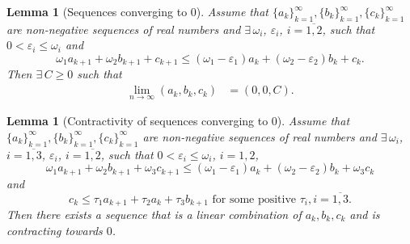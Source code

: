 \documentclass[3p]{elsarticle}
\newtheorem{lemma}[theorem]{Lemma}
\begin{document}
\begin{lemma}[Sequences converging to $0$]\label{lem:SeqConv0}
 Assume that $\{a_k\}_{k=1}^\infty, \{b_k\}_{k=1}^\infty, \{c_k\}_{k=1}^\infty$ are non-negative sequences of real numbers and $\exists \, \omega_i$, $\varepsilon_i$, $i=\overline{1,2}$, such that $0<\varepsilon_i \le \omega_i$ and 
 \begin{equation*}
  \omega_1 a_{k+1} + \omega_2 b_{k+1} + c_{k+1} \leq \left(\omega_1-\varepsilon_1 \right) a_k + \left(\omega_2 - \varepsilon_2 \right) b_{k} + c_{k}.
 \end{equation*}
Then $\exists \, C \ge 0$ such that 
\begin{align*}
 \lim\limits_{n \rightarrow \infty} \left(a_k,b_k,c_k\right) & = (0,0,C).
\end{align*}
\end{lemma}
\begin{lemma}[Contractivity of sequences converging to $0$]\label{ContractivitySequence}
Assume that $\{a_k\}_{k=1}^\infty, \{b_k\}_{k=1}^\infty, \{c_k\}_{k=1}^\infty$ are non-negative sequences of real numbers and $\exists \, \omega_i$, $i=\overline{1,3}$, $\varepsilon_i$, $i=\overline{1,2}$, such that $0<\varepsilon_i \le \omega_i$, $i=1,2$, 
 \begin{equation}
  \omega_1 a_{k+1} + \omega_2 b_{k+1} + \omega_3 c_{k+1} \leq \left(\omega_1-\varepsilon_1 \right) a_k + \left(\omega_2 - \varepsilon_2 \right) b_{k} + \omega_3 c_{k}
  \label{eq:Contract1}
 \end{equation}
 and 
 \begin{equation}
 c_{k} \le \tau_1 a_{k+1} + \tau_2 a_{k} + \tau_3 b_{k+1} \text{ for some positive } \tau_i, i=\overline{1,3}.
 \label{eq:Contract2}
 \end{equation}
Then there exists a sequence that is a linear combination of $a_{k}, b_{k}, c_{k}$ and is contracting towards $0$.
\end{lemma}
\end{document}
